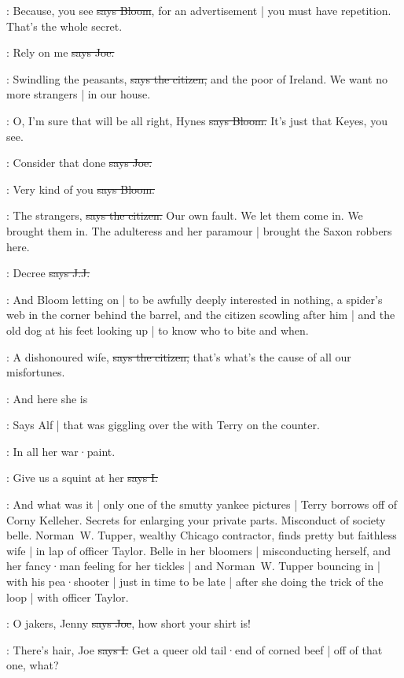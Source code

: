\Bloom:
Because,
you see
\sout{says Bloom},
for an advertisement |
you must have repetition.
That's the whole secret.

\joe:
Rely on me
\sout{says Joe.}

\citizen:
Swindling the peasants,
\sout{says the citizen,}
and the poor of Ireland.
We want no more strangers |
in our house.

\Bloom:
O,
I'm sure that will be all right,
Hynes
\sout{says Bloom.}
It's just that Keyes,
you see.

\joe:
Consider that done
\sout{says Joe.}

\Bloom:
Very kind of you
\sout{says Bloom.}

\citizen:
The strangers,
\sout{says the citizen.}
Our own fault.
We let them come in.
We brought them in.
The adulteress and her paramour |
brought the Saxon robbers here.

\jjom:
Decree 
\sout{says J.J.}

\Nq:
And Bloom letting on |
to be awfully deeply interested in nothing,
a spider's web in the corner behind the barrel,
and the citizen scowling after him |
and the old dog at his feet looking up |
to know who to bite and when.

\citizen:
A dishonoured wife,
\sout{says the citizen,}
that's what's the cause of all our misfortunes.

\bergan:
And here she is

\Nq:
Says Alf |
that was giggling over the 
with Terry on the counter.

\bergan:
In all her war·paint.

:
Give us a squint at her
\sout{says I.}

\Nq:
And what was it |
only one of the smutty yankee pictures |
Terry borrows off of Corny Kelleher.
Secrets for enlarging your private parts.
Misconduct of society belle.
Norman~W. Tupper,
wealthy Chicago contractor,
finds pretty but faithless wife |
in lap of officer Taylor.
Belle in her bloomers |
misconducting herself,
and her fancy·man feeling for her tickles |
and Norman~W. Tupper bouncing in |
with his pea·shooter |
just in time to be late |
after she doing the trick of the loop |
with officer Taylor.

\joe:
O jakers,
Jenny
\sout{says Joe},
how short your shirt is!

:
There's hair,
Joe
\sout{says I.}
Get a queer old tail·end of corned beef |
off of that one,
what?


